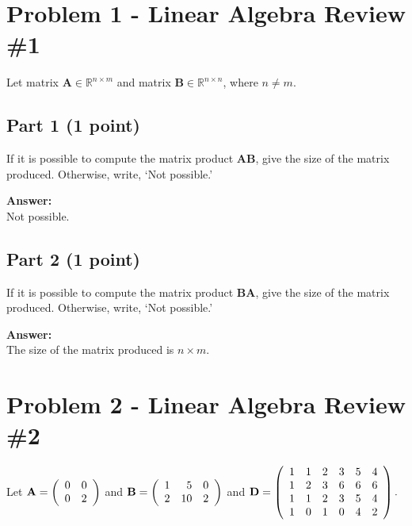 \documentclass[11pt, oneside]{article}   	%
\begin{document}



\clearpage

\section*{Problem 1 - Linear Algebra Review \#1}

Let matrix $\mathbf{A} \in \mathbb{R}^{n\times m}$ and matrix  $\mathbf{B} \in \mathbb{R}^{n \times n}$, where $n \neq m$.

\subsection*{Part 1 (1 point)}
 If it is possible to compute the matrix product $\mathbf{AB}$, give the size of the matrix produced. Otherwise, write, `Not possible.' 

\textbf{Answer:} \\
Not possible. 

\subsection*{Part 2 (1 point)}
If it is possible to compute the matrix product $\mathbf{BA}$, give the size of the matrix produced. Otherwise, write, `Not possible.' 

\textbf{Answer:} \\
The size of the matrix produced is $ n \times m $.

\clearpage

\section*{Problem 2 - Linear Algebra Review \#2}
Let  $
 {\bf{A}} = \left( {\begin{array}{*{20}r}
   0 & 0   \\
   0 & 2   \\
\end{array}} \right)
 $
and
$
 {\bf{B}} = \left( {\begin{array}{*{20}r}
   1 & 5 & 0  \\
   2 & 10 & 2  \\
\end{array}} \right)  
$
and
${\bf{D}} = \left( {\begin{array}{*{20}r}
   1 & 1 & 2 & 3 & 5 & 4 \\
   1 & 2 & 3 & 6 & 6 & 6 \\
   1 & 1 & 2 & 3 & 5 & 4 \\
   1 & 0 & 1 & 0 & 4 & 2 \\
\end{array}} \right). \\ 
$ 
\end{document}
